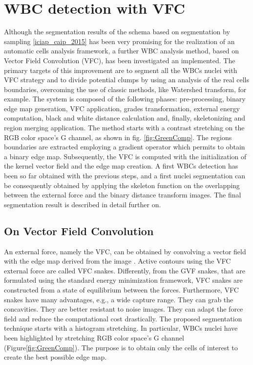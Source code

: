 \documentclass[final,a4paper,12pt,english]{UnicaPhdThesis3}
\begin{document}
{\section{WBC detection with VFC} %
\label{visapp2018}
Although the segmentation results of the schema based on segmentation by sampling \ref{iciap_caip_2015} has been very promising for the realization of an automatic cells analysis framework, a further WBC analysis method, based on Vector Field Convolution (VFC), has been investigated an implemented.
The primary targets of this improvement are to segment all the WBCs nuclei with VFC strategy and to divide potential clumps by using an analysis of the real cells boundaries, overcoming the use of classic methods, like Watershed transform, for example. 
The system is composed of the following phases: pre-processing, binary edge map generation, VFC \cite{Bing} application, grades transformation, external energy computation, black and white distance calculation and, finally, skeletonizing and region merging application. The method starts with a contrast stretching on the RGB color space's G channel, as shown in fig. \ref{fig:GreenComp}. 
The regions boundaries are extracted employing a gradient operator which permits to obtain a binary edge map. Subsequently, the VFC is computed with the initialization of the kernel vector field and the edge map creation. A first WBCs detection has been so far obtained with the previous steps, and a first nuclei segmentation can be consequently obtained by applying the skeleton function on the overlapping between the external force and the binary distance transform images. The final segmentation result is described in detail further on.

\subsection{On Vector Field Convolution}
An external force, namely the VFC, can be obtained by convolving a vector field with the edge map derived from the image \cite{Bing}. 
Active contours using the VFC external force are called VFC snakes. Differently, from the GVF \cite{Xu} snakes, that are formulated using the standard energy minimization framework, VFC snakes are constructed from a state of equilibrium between the forces. Furthermore, VFC snakes have many advantages, e.g., a wide capture range. They can grab the concavities. They are better resistant to noise images. They can adapt the force field and reduce the computational cost drastically.
The proposed segmentation technique starts with a histogram stretching. In particular, WBCs nuclei have been highlighted by stretching RGB color space's G channel (Figure\ref{fig:GreenComp}).
The purpose is to obtain only the cells of interest to create the best possible edge map.

}
\end{document}

